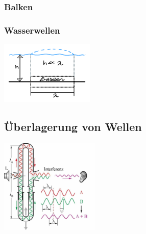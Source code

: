 \subsubsection{Balken}

\subsubsection{Wasserwellen}
\begin{center}
	\begin{minipage}{0.3\textwidth}
	\end{minipage}%
	\begin{minipage}{0.2\textwidth}
		\includegraphics[height=3cm,keepaspectratio=true]{Images/Wasserwelle.png}
	\end{minipage}
\end{center}


\subsection{Überlagerung von Wellen}
\begin{center}
	\begin{minipage}{0.3\textwidth}
	\end{minipage}%
	\begin{minipage}{0.2\textwidth}
		\includegraphics[height=4.5cm,right,keepaspectratio=true]{Images/wellen_ueberlagerung_selbe_quelle.png}
	\end{minipage}
\end{center}

